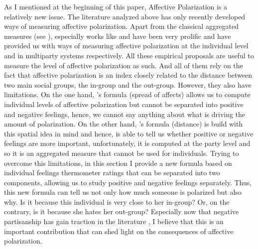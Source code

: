 \documentclass[a4paper, svgnames]{article}
\newcommand{\citeposs}[1]{\citeauthor{#1}'s \citeyearpar{#1}}
\begin{document}
As I mentioned at the beginning of this paper, Affective Polarization is a relatively new issue. The literature analyzed above has only recently developed ways of measuring affective polarization. Apart from the classical aggregated measures (see \citet*{Druckman2019}), especially works like \citet*{Wagner2021} and \citet*{Reiljan2020} have been very prolific and have provided us with ways of measuring affective polarization at the individual level and in multiparty systems respectively. All these empirical proposals are useful to measure the level of affective polarization as such. And all of them rely on the fact that affective polarization is an index closely related to the distance between two main social groups, the in-group and the out-group. However, they also have limitations. On the one hand, \citeposs{Wagner2021} formula (spread of affects) allows us to compute individual levels of affective polarization but cannot be separated into positive and negative feelings, hence, we cannot say anything about what is driving the amount of polarization. On the other hand, \citeposs{Reiljan2020} formula (distance) is build with this spatial idea in mind and hence, is able to tell us whether positive or negative feelings are more important, unfortunately, it is computed at the party level and so it is an aggregated measure that cannot be used for individuals. Trying to overcome this limitations, in this section I provide a new formula based on individual feelings thermometer ratings that can be separated into two components, allowing us to study positive and negative feelings separately. Thus, this new formula can tell us not only how much someone is polarized but also why. Is it because this individual is very close to her in-group? Or, on the contrary, is it because she hates her out-group? Especially now that negative partisanship has gain traction in the literature \citep{Medeiros2013,Abramowitz2016, Wagner2021}, I believe that this is an important contribution that can shed light on the consequences of affective polarization.
\end{document}
